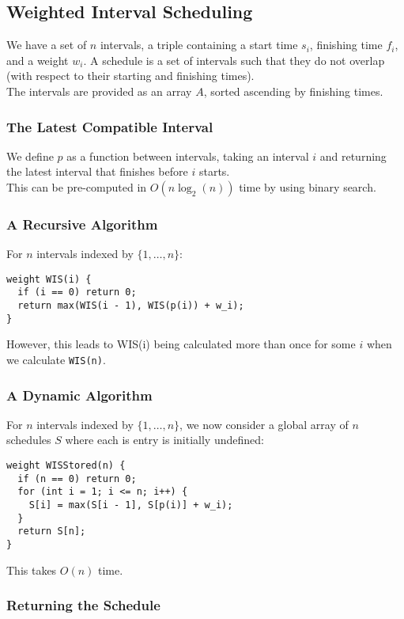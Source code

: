 \subsection{Weighted Interval Scheduling}

We have a set of $n$ intervals, a triple containing a
start time $s_i$, finishing time $f_i$, and a weight $w_i$.
A schedule is a set of intervals such that they do not overlap
(with respect to their starting and finishing times).
\\[\baselineskip]
The intervals are provided as an array $A$, sorted ascending by
finishing times.

\subsubsection{The Latest Compatible Interval}

We define $p$ as a function between intervals, taking an interval $i$ and 
returning the latest interval that finishes before $i$ starts.
\\[\baselineskip]
This can be pre-computed in $O(n\log_2(n))$ time by using binary search.

\subsubsection{A Recursive Algorithm}

For $n$ intervals indexed by $\{1, \ldots, n\}$: \begin{lstlisting}
weight WIS(i) {
  if (i == 0) return 0;
  return max(WIS(i - 1), WIS(p(i)) + w_i);
}
\end{lstlisting} However, this leads to WIS(i) being calculated more than once
for some $i$ when we calculate \texttt{WIS(n)}.

\subsubsection{A Dynamic Algorithm}

For $n$ intervals indexed by $\{1, \ldots, n\}$, we now consider a global array 
of $n$ schedules $S$ where each is entry is initially undefined: \begin{lstlisting}
weight WISStored(n) {
  if (n == 0) return 0;
  for (int i = 1; i <= n; i++) {
    S[i] = max(S[i - 1], S[p(i)] + w_i);
  }
  return S[n];
}
\end{lstlisting} This takes $O(n)$ time.

\subsubsection{Returning the Schedule}


